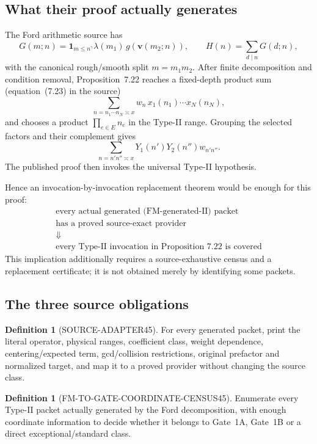 \documentclass[11pt]{article}
\theoremstyle{definition}
\newtheorem{definition}[theorem]{Definition}
\newcommand{\1}{\mathbf 1}
\begin{document}
\subsection{What their proof actually generates}

The Ford arithmetic source has
\[
G(m;n)
=
\mathbf 1_{m\le n^\gamma}\lambda(m_1)\,
g(\mathbf v(m_2;n)),
\qquad
\boxed{H(n)=\sum_{d\mid n}G(d;n),}
\tag{FM-GH}
\]
with the canonical rough/smooth split $m=m_1m_2$.
After finite decomposition and condition removal, Proposition~7.22 reaches a fixed-depth
product sum (equation~(7.23) in the source)
\[
\sum_{n=n_1\cdots n_N\asymp x}
w_n\,x_1(n_1)\cdots x_N(n_N),
\tag{FM-7.23}
\]
and chooses a product $\prod_{e\in E}n_e$ in the Type-II range.
Grouping the selected factors and their complement gives
\[
\boxed{
\sum_{n=n'n''\asymp x}
Y_1(n')Y_2(n'')w_{n'n''}.
}
\tag{FM-generated-II}
\]
The published proof then invokes the universal Type-II hypothesis.

Hence an invocation-by-invocation replacement theorem would be enough for this proof:
\[
\boxed{
\begin{gathered}
\text{every actual generated (FM-generated-II) packet}\\
\text{has a proved source-exact provider}\\
\Downarrow\\
\text{every Type-II invocation in Proposition 7.22 is covered}
\end{gathered}}
\tag{FM-replacement-logic}
\]
This implication additionally requires a source-exhaustive census and a replacement
certificate; it is not obtained merely by identifying some packets.

\subsection{The three source obligations}

\begin{definition}[SOURCE-ADAPTER45]
For every generated packet, print the literal operator, physical ranges, coefficient
class, weight dependence, centering/expected term, gcd/collision restrictions, original
prefactor and normalized target, and map it to a proved provider without changing the
source class.
\end{definition}

\begin{definition}[FM-TO-GATE-COORDINATE-CENSUS45]
Enumerate every Type-II packet actually generated by the Ford decomposition, with enough
coordinate information to decide whether it belongs to Gate~1A, Gate~1B or a direct
exceptional/standard class.
\end{definition}
\end{document}
